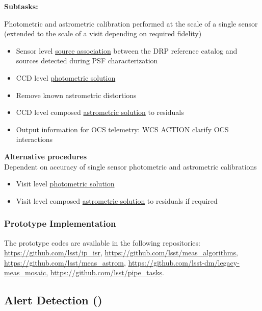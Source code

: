 \noindent
{\bf Subtasks:}

Photometric and astrometric calibration performed at the scale of a
single sensor (extended to the scale of a visit depending on required fidelity)
\begin{itemize}
\item Sensor level \hyperref[sec:acSingleCCDReferenceMatching]{source
    association} between the DRP reference catalog and sources
  detected during PSF characterization
\item CCD level \hyperref[sec:acSingleCCDPhotometricFit]{photometric solution}
\item Remove known astrometric distortions 
\item CCD level composed \hyperref[sec:acSingleCCDAstrometricFit]{astrometric
    solution} to residuals
\item Output information for OCS telemetry: WCS ACTION clarify OCS interactions
\end{itemize}

{\bf Alternative procedures}\\
Dependent on accuracy of single sensor photometric and astrometric calibrations
\begin{itemize}
\item Visit level \hyperref[sec:acSingleVisitPhotometricFit]{photometric solution}
\item Visit level composed 
  \hyperref[sec:acSingleVisitAstrometricFit]{astrometric solution} to 
  residuals if required 
\end{itemize}
\noindent


\subsubsection{Prototype Implementation}

The prototype codes are available in the following repositories: \url{https://github.com/lsst/ip_isr}, \url{https://github.com/lsst/meas_algorithms}, \url{https://github.com/lsst/meas_astrom}, \url{https://github.com/lsst-dm/legacy-meas_mosaic}, \url{https://github.com/lsst/pipe_tasks}.

\clearpage

\subsection{Alert Detection (\wbsDiffim)}
\label{sec:apAlertDetection}

